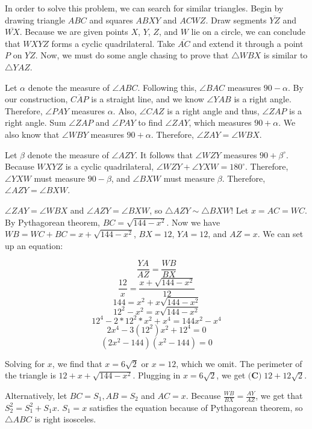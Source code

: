 \begin{enumerate}
In order to solve this problem, we can search for similar triangles. Begin by drawing triangle $ABC$ and squares $ABXY$ and $ACWZ$. Draw segments $\overline{YZ}$ and $\overline{WX}$. Because we are given points $X$, $Y$, $Z$, and $W$ lie on a circle, we can conclude that $WXYZ$ forms a cyclic quadrilateral. Take $\overline{AC}$ and extend it through a point $P$ on $\overline{YZ}$. Now, we must do some angle chasing to prove that $\triangle WBX$ is similar to $\triangle YAZ$. 

 Let $\alpha$ denote the measure of $\angle ABC$. Following this, $\angle BAC$ measures $90 - \alpha$. By our construction, $\overline{CAP}$ is a straight line, and we know $\angle YAB$ is a right angle. Therefore, $\angle PAY$ measures $\alpha$. Also, $\angle CAZ$ is a right angle and thus, $\angle ZAP$ is a right angle. Sum $\angle ZAP$ and $\angle PAY$ to find $\angle ZAY$, which measures $90 + \alpha$. We also know that $\angle WBY$ measures $90 + \alpha$. Therefore, $\angle ZAY = \angle WBX$. 

 Let $\beta$ denote the measure of $\angle AZY$. It follows that $\angle WZY$ measures $90 + \beta^\circ$. Because $WXYZ$ is a cyclic quadrilateral, $\angle WZY + \angle YXW = 180^\circ$. Therefore, $\angle YXW$ must measure $90 - \beta$, and $\angle BXW$ must measure $\beta$. Therefore, $\angle AZY = \angle BXW$. 

 $\angle ZAY = \angle WBX$ and $\angle AZY = \angle BXW$, so $\triangle AZY \sim \triangle BXW$! Let $x = AC = WC$. By Pythagorean theorem, $BC = \sqrt{144-x^2}$. Now we have $WB = WC + BC = x + \sqrt{144-x^2}$, $BX = 12$, $YA = 12$, and $AZ = x$. We can set up an equation: 

 
 \[\frac{YA}{AZ} = \frac{WB}{BX}\]
 \[\frac{12}{x} = \frac{x+\sqrt{144-x^2}}{12}\]
 \[144 = x^2 + x\sqrt{144-x^2}\]
 \[12^2 - x^2 = x\sqrt{144-x^2}\]
 \[12^4 - 2*12^2*x^2 + x^4 = 144x^2 - x^4\]
 \[2x^4 - 3(12^2)x^2 + 12^4 = 0\]
 \[(2x^2 - 144)(x^2 - 144) = 0\]

 Solving for $x$, we find that $x = 6\sqrt{2}$ or $x = 12$, which we omit. The perimeter of the triangle is $12 + x + \sqrt{144-x^2}$. Plugging in $x = 6\sqrt{2}$, we get $\boxed{\textbf{(C)}\; 12+12\sqrt{2}}$.

 
Alternatively, let $BC = S_1, AB = S_2$ and $AC = x$. Because $\frac{WB}{BX} = \frac{AY}{AZ}$, we get that $S_2^2 = S_1^2 + S_1x$. $S_1 = x$ satisfies the equation because of Pythagorean theorem, so $\triangle ABC$ is right isosceles.

 




\end{enumerate}
